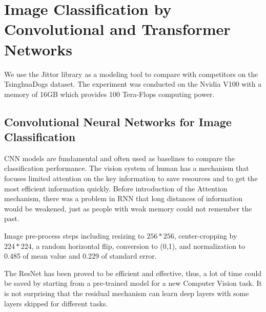 \documentclass[runningheads]{llncs}
\begin{document}

\section{Image Classification by Convolutional and Transformer Networks}

We use the Jittor\cite{hu2020jittor} library as a modeling tool to compare with competitors on the TsinghuaDogs\cite{Zou2020ThuDogs} dataset.
The experiment was conducted on the Nvidia V100 with a memory of 16GB which provides 100 Tera-Flops computing power.

\subsection{Convolutional Neural Networks for Image Classification}

\par CNN models are fundamental and often used as baselines to compare the classification performance.
The vision system of human has a mechanism that focuses limited attention on the key information to save resources and to get the most efficient information quickly.
Before introduction of the Attention mechanism, there was a problem in RNN that long distances of information would be weakened,
just as people with weak memory could not remember the past.

\par Image pre-process steps including resizing to $256*256$, center-cropping by $224*224$, a random horizontal flip, conversion to (0,1), and normalization to 0.485 of mean value and 0.229 of standard error.

\par The ResNet has been proved to be efficient and effective, thus, a lot of time could be saved by starting from a pre-trained model for a new Computer Vision task.
It is not surprising that the residual mechanism can learn deep layers with some layers skipped for different tasks.
\end{document}
